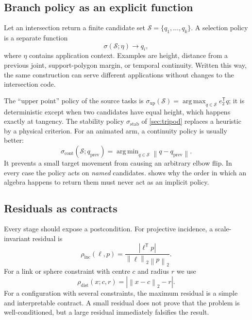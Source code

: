 \documentclass[11pt,a4paper]{article}
\theoremstyle{plain}
\theoremstyle{definition}
\theoremstyle{remark}
\newcommand{\T}{\mathsf{T}}
\newcommand{\norm}[1]{\left\lVert#1\right\rVert}
\newcommand{\abs}[1]{\left\lvert#1\right\rvert}
\DeclareMathOperator*{\argmax}{arg\,max}
\DeclareMathOperator*{\argmin}{arg\,min}
\begin{document}
\subsection{Branch policy as an explicit function}

Let an intersection return a finite candidate set
$\mathcal S=\{q_1,\ldots,q_k\}$. A selection policy is a separate function
\begin{equation}
  \sigma(\mathcal S;\eta)\longrightarrow q_i ,
  \label{eq:selection-policy}
\end{equation}
where $\eta$ contains application context. Examples are height, distance from a
previous joint, support-polygon margin, or temporal continuity. Written this
way, the same construction can serve different applications without changes to
the intersection code.

The ``upper point'' policy of the source tasks is
$\sigma_{\mathrm{up}}(\mathcal S)=\argmax_{q\in\mathcal S}e_2^{\T}q$; it is
deterministic except when two candidates have equal height, which happens
exactly at tangency. The stability policy $\sigma_{\mathrm{stab}}$ of
\cref{sec:tripod} replaces a heuristic by a physical criterion. For an animated
arm, a continuity policy is usually better:
\begin{equation}
  \sigma_{\mathrm{cont}}(\mathcal S;q_{\mathrm{prev}})
  =\argmin_{q\in\mathcal S}\norm{q-q_{\mathrm{prev}}} .
  \label{eq:continuity-policy}
\end{equation}
It prevents a small target movement from causing an arbitrary elbow flip. In
every case the policy acts on \emph{named} candidates.  shows
why the order in which an algebra happens to return them must never act as an
implicit policy.

\subsection{Residuals as contracts}

Every stage should expose a postcondition. For projective incidence, a
scale-invariant residual is
\begin{equation}
  \rho_{\mathrm{inc}}(\ell,p)=
  \frac{\abs{\ell^{\T}p}}{\norm{\ell}_2\norm{p}_2} .
  \label{eq:incidence-residual}
\end{equation}
For a link or sphere constraint with centre $c$ and radius $r$ we use
\begin{equation}
  \rho_{\mathrm{dist}}(x;c,r)=\abs{\norm{x-c}_2-r} .
  \label{eq:distance-residual}
\end{equation}
For a configuration with several constraints, the maximum residual is a simple
and interpretable contract. A small residual does not prove that the problem is
well-conditioned, but a large residual immediately falsifies the result.
\end{document}
